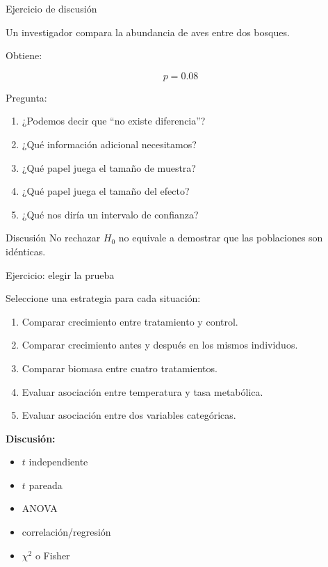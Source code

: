 \documentclass[aspectratio=169,11pt]{beamer}
\begin{document}
\begin{frame}{Ejercicio de discusión}

Un investigador compara la abundancia de aves entre dos bosques.

Obtiene:

\[
p=0.08
\]

Pregunta:

\begin{enumerate}
    \item ¿Podemos decir que ``no existe diferencia''?
    \item ¿Qué información adicional necesitamos?
    \item ¿Qué papel juega el tamaño de muestra?
    \item ¿Qué papel juega el tamaño del efecto?
    \item ¿Qué nos diría un intervalo de confianza?
\end{enumerate}

\vspace{0.3cm}

\pause

\begin{block}{Discusión}
No rechazar $H_0$ no equivale a demostrar que las poblaciones son idénticas.
\end{block}

\end{frame}

\begin{frame}{Ejercicio: elegir la prueba}

Seleccione una estrategia para cada situación:

\begin{enumerate}
    \item Comparar crecimiento entre tratamiento y control.
    \item Comparar crecimiento antes y después en los mismos individuos.
    \item Comparar biomasa entre cuatro tratamientos.
    \item Evaluar asociación entre temperatura y tasa metabólica.
    \item Evaluar asociación entre dos variables categóricas.
\end{enumerate}

\vspace{0.3cm}

\pause

\textbf{Discusión:}

\begin{itemize}
    \item $t$ independiente
    \item $t$ pareada
    \item ANOVA
    \item correlación/regresión
    \item $\chi^2$ o Fisher
\end{itemize}

\end{frame}
\end{document}
